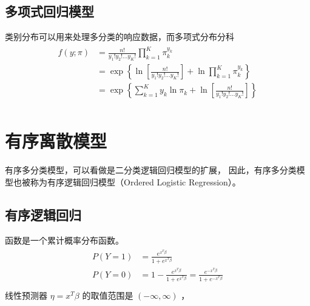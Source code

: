 \documentclass[letterpaper,10pt,english]{sphinxmanual}
\begin{document}
\section{多项式回归模型}
\label{\detokenize{_u65e0_u5e8f_u79bb_u6563_u6a21_u578b/content:id6}}
类别分布可以用来处理多分类的响应数据，而多项式分布分科
\begin{align}\label{equation:无序离散模型/content:无序离散模型/content:25}\!\begin{aligned}
f(y;\pi) &= \frac{n!}{y_1!y_2!\dots y_K! }\prod_{k=1}^{K}  \pi_k^{y_k}\\
&=\exp \left \{  \ln \left [ \frac{n!}{y_1!y_2!\dots y_K! } \right ]
+ \ln   \prod_{k=1}^{K}  \pi_k^{y_k}
\right \}\\
&= \exp \left \{
\sum_{k=1}^{K} {y_k}   \ln   \pi_k
+
\ln \left [ \frac{n!}{y_1!y_2!\dots y_K! } \right ]
\right \}\\
\end{aligned}\end{align}

\chapter{有序离散模型}
\label{\detokenize{_u6709_u5e8f_u79bb_u6563_u6a21_u578b/content:id1}}\label{\detokenize{_u6709_u5e8f_u79bb_u6563_u6a21_u578b/content::doc}}
有序多分类模型，可以看做是二分类逻辑回归模型的扩展，
因此，有序多分类模型也被称为有序逻辑回归模型（Ordered Logistic Regression）。


\section{有序逻辑回归}
\label{\detokenize{_u6709_u5e8f_u79bb_u6563_u6a21_u578b/content:id2}}
 函数是一个累计概率分布函数。
\begin{align}\label{equation:有序离散模型/content:有序离散模型/content:0}\!\begin{aligned}
P(Y=1) &= \frac{e^{x^T\beta}}{1+e^{x^T\beta}}\\
P(Y=0) &= 1-\frac{e^{x^T\beta}}{1+e^{x^T\beta}}
= \frac{e^{-x^T\beta}}{1+e^{-x^T\beta}}\\
\end{aligned}\end{align}
线性预测器 \(\eta=x^T \beta\) 的取值范围是 \((-\infty,\infty)\)
，
\end{document}
